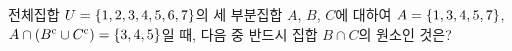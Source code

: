 전체집합 $U=\{1{,}\mkern3mu\mathopen{}2{,}\mkern3mu\mathopen{}3{,}\mkern3mu\mathopen{}4{,}\mkern3mu\mathopen{}5{,}\mkern3mu\mathopen{}6{,}\mkern3mu\mathopen{}7\}$의 세 부분집합 $A$, $B$, $C$에 대하여 $A=\{1{,}\mkern3mu\mathopen{}3{,}\mkern3mu\mathopen{}4{,}\mkern3mu\mathopen{}5{,}\mkern3mu\mathopen{}7\}$, $A\cap({B}^{\mathrm{c}}\cup{C}^{\mathrm{c}})=\{3{,}\mkern3mu\mathopen{}4{,}\mkern3mu\mathopen{}5\}$일 때, 다음 중 반드시 집합 $B\cap C$의 원소인 것은?
